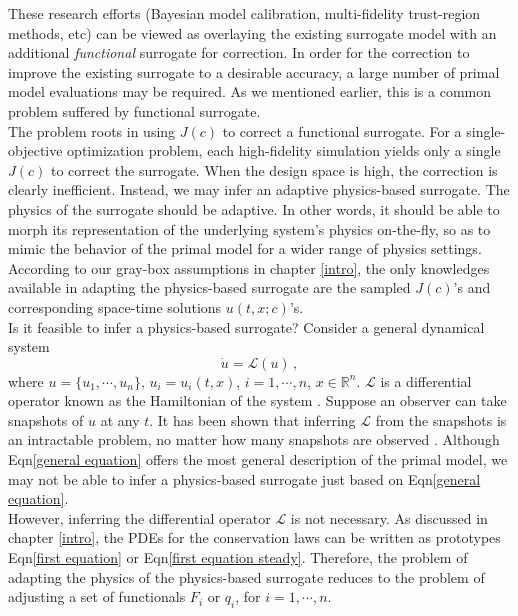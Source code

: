 \documentclass[a4paper,onecolumn]{article}
\theoremstyle{remark}
\begin{document}
\noindent These research efforts (Bayesian model calibration, multi-fidelity 
trust-region methods, etc) can be viewed as overlaying the existing surrogate model with 
an additional \emph{functional}
surrogate for correction. In order for the correction to improve the existing surrogate 
to a desirable accuracy, a large number of primal model evaluations may be required.
As we mentioned earlier, this is a common problem suffered by functional surrogate.\\

\noindent The problem roots in using $J(c)$ to correct a functional surrogate. 
For a single-objective optimization problem, each high-fidelity simulation yields
only a single $J(c)$ to correct the surrogate. When the design space is high, the
correction is clearly inefficient. Instead, we may infer an adaptive physics-based surrogate.
The physics of the surrogate should be adaptive. 
In other words, it should be able to morph its representation of the 
underlying system's physics on-the-fly, so as to mimic the behavior of the primal model for
a wider range of physics settings.
According to our gray-box assumptions in chapter \ref{intro},
the only knowledges available in adapting the physics-based surrogate
are the sampled $J(c)$'s and corresponding space-time solutions $u(t,x;c)$'s.\\

\noindent Is it feasible to infer a
physics-based surrogate? Consider a general dynamical system
\begin{equation}
    \dot{u} = \mathcal{L}(u)\,,
    \label{general equation}
\end{equation}
where $u=\{u_1,\cdots, u_n\}$, $u_i = u_i(t,x)$, $i=1,\cdots,n$, $x\in \mathbb{R}^n$.
$\mathcal{L}$ is a differential operator known as the Hamiltonian of the system 
\cite{Hamilton Fluid Dynamics}.
Suppose an observer can take snapshots of $u$ at any $t$.
It has been shown that inferring $\mathcal{L}$ from the snapshots is an intractable
problem, no matter how many snapshots are observed \cite{NP hard}.
Although Eqn\eqref{general equation} offers the most general description of the 
primal model, we may not be able to infer a physics-based surrogate 
just based on Eqn\eqref{general equation}.\\

\noindent However, inferring the differential operator $\mathcal{L}$ 
is not necessary. As discussed in
chapter \ref{intro}, 
the PDEs for the conservation laws can be written as prototypes Eqn\eqref{first equation}
or Eqn\eqref{first equation steady}.
Therefore, the problem of adapting the physics of the physics-based surrogate reduces to the
problem of adjusting a set of functionals $F_i$ or
$q_i$, for $i=1,\cdots,n$. \\
\end{document}
